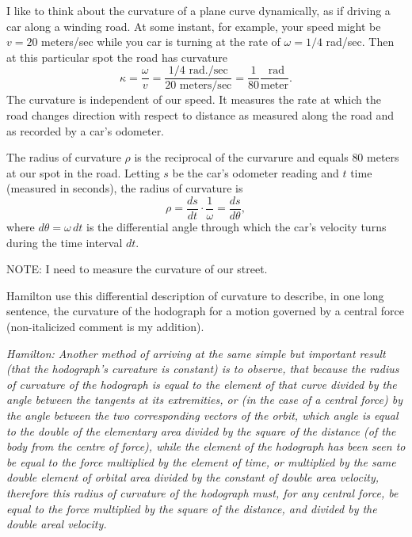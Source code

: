 \documentclass{ximera}
\begin{document}
I like to think about the curvature of a plane curve dynamically, as if driving a car along a winding road. At some instant, for example, your speed might be $v = 20$ meters/sec while you car is turning at the rate of $\omega = 1/4$ rad/sec. Then at this particular spot the road has curvature 
\[
    \kappa = \frac{\omega}{v} = \frac{1/4\text{ rad./sec}}{20 \text{ meters/sec}} = \frac{1}{80} \frac{\text{ rad}}{\text{meter}}.
\]
The curvature is independent of our speed. It measures the rate at which the road changes direction with respect to distance as measured along the road and as recorded by a car's odometer.  %

The radius of curvature $\rho$ is the reciprocal of the curvarure and equals $80$ meters at our spot in the road. Letting $s$ be the car's odometer reading and $t$ time (measured in seconds), the radius of curvature is
\[
    \rho =  \frac{ds}{dt} \cdot \frac{1}{\omega} = \frac{ds}{d\theta},
\]
where $d\theta = \omega \, dt$ is the differential angle through which the car's velocity turns during the time interval $dt$.

NOTE: I need to measure the curvature of our street.

Hamilton use this differential description of curvature to describe, in one long sentence, the curvature of the hodograph for a motion governed by a central force (non-italicized comment is my addition).

\emph{Hamilton: Another method of arriving at the same simple but important result (\emph{that the hodograph's curvature is constant}) is to observe, that because the radius of curvature of the hodograph is equal to the element of that curve divided by the angle between the tangents at its extremities, or (in the case of a central force) by the angle between the two corresponding vectors of the orbit, which angle is equal to the double of the elementary area divided by the square of the distance (of the body from the centre of force), while the element of the hodograph has been seen to be equal to the force multiplied by the element of time, or multiplied by the same double element of orbital area divided by the constant of double area velocity, therefore this radius of curvature of the hodograph must, for any central force, be equal to the force multiplied by the square of the distance, and divided by the double areal velocity.
} 
\end{document}
